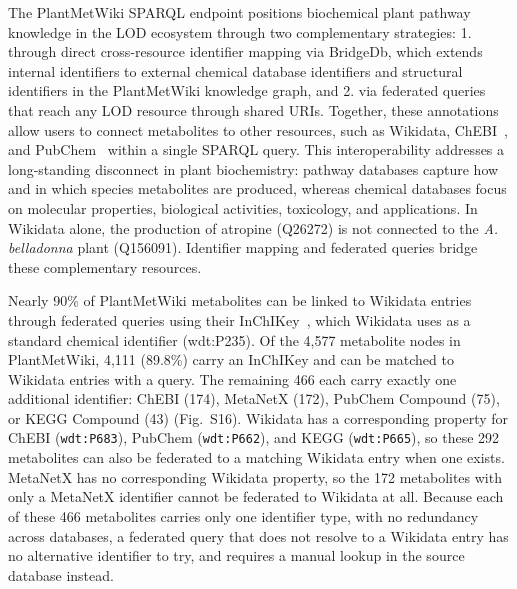 \documentclass[11pt,a4paper]{article}
\begin{document}
The PlantMetWiki SPARQL endpoint positions biochemical plant pathway knowledge in the LOD ecosystem through
two complementary strategies: 1. through direct cross-resource identifier mapping via BridgeDb, which
extends internal identifiers to external chemical database identifiers and structural identifiers in the PlantMetWiki knowledge graph, and 2. via
federated queries that reach any LOD resource through shared URIs. Together, these annotations allow users to connect metabolites to other
resources, such as Wikidata, ChEBI~\cite{malik2026}, and PubChem~\cite{kim2025} within a single
SPARQL query. This
interoperability addresses a long-standing disconnect in plant biochemistry: pathway databases
capture how and in which species metabolites are produced, whereas chemical databases focus on
molecular properties, biological activities, toxicology, and applications. In Wikidata alone, the
production of atropine (Q26272) is not connected to the \textit{A. belladonna} plant (Q156091). Identifier mapping and federated queries bridge these complementary resources. 

Nearly 90\% of PlantMetWiki metabolites can be linked to Wikidata entries through federated queries using
their InChIKey~\cite{heller2015}, which Wikidata uses as a standard chemical identifier (wdt:P235). Of the 4,577
metabolite nodes in PlantMetWiki, 4,111 (89.8\%) carry an InChIKey and can be matched to Wikidata entries
with a query. The remaining 466 each carry exactly one additional identifier: ChEBI (174), MetaNetX
(172), PubChem Compound (75), or KEGG Compound (43) (Fig.~S16). Wikidata has a corresponding property
for ChEBI (\texttt{wdt:P683}), PubChem (\texttt{wdt:P662}), and KEGG (\texttt{wdt:P665}), so these 292
metabolites can also be federated to a matching Wikidata entry when one exists. MetaNetX has no
corresponding Wikidata property, so the 172 metabolites with only a MetaNetX identifier cannot be
federated to Wikidata at all. Because each of these 466 metabolites carries only one identifier type,
with no redundancy across databases, a federated query that does not resolve to a Wikidata entry has no
alternative identifier to try, and requires a manual lookup in the source database instead.
\end{document}
